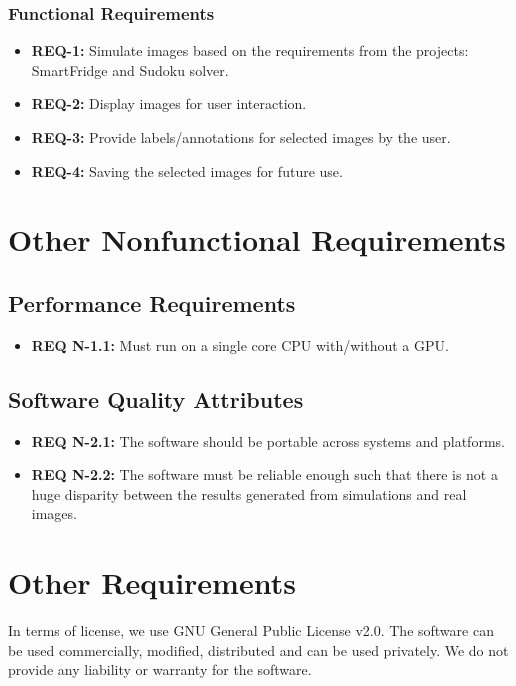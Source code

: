 \documentclass[a4paper,12pt]{article}
\begin{document}
\subsubsection{Functional Requirements}
\begin{itemize}
\item \textbf{REQ-1:} Simulate images based on the requirements from the projects: SmartFridge and Sudoku solver.
\item \textbf{REQ-2:} Display images for user interaction.
\item \textbf{REQ-3:} Provide labels/annotations for selected images by the user.
\item \textbf{REQ-4:} Saving the selected images for future use.
\end{itemize}
\section{Other Nonfunctional Requirements}
\subsection{Performance Requirements}
\begin{itemize}
\item \textbf{REQ N-1.1:} Must run on a single core CPU with/without a GPU.
\end{itemize}

\subsection{Software Quality Attributes}
\begin{itemize}
\item \textbf{REQ N-2.1:} The software should be portable across systems and platforms.
\item \textbf{REQ N-2.2:} The software must be reliable enough such that there is not a huge disparity between the results generated from simulations and real images.
\end{itemize}

\section{Other Requirements}
In terms of license, we use GNU General Public License v2.0. The software can be used commercially, modified, distributed and can be used privately. We do not provide any liability or warranty for the software.
\end{document}

